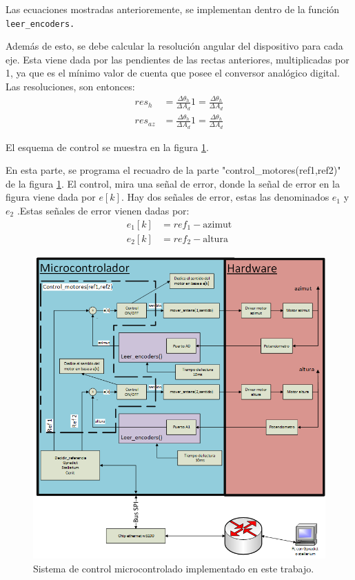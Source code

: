 Las ecuaciones mostradas anterioremente, se implementan dentro de la función \texttt{leer_encoders.} 

Además de esto, se debe calcular la resolución angular del dispositivo para cada eje. Esta viene dada por las pendientes de las rectas anteriores, multiplicadas por 1, ya que es el mínimo valor de cuenta que posee el conversor analógico digital. Las resoluciones, son entonces: 
\begin{equation}
	\begin{split}
		res_h &= \frac{ \Delta\theta_h}{\Delta A_d}  1 = \frac{ \Delta\theta_h}{\Delta A_d} \\  
		res_{az} &= \frac{ \Delta\theta_h}{\Delta A_d}  1 = \frac{ \Delta\theta_h}{\Delta A_d}   	
	\end{split}
\end{equation}


El esquema de control se muestra en la figura  \ref{fig:sist_control_real}. 

En esta parte, se programa el recuadro de la parte "control\_motores(ref1,ref2)" de la figura \ref{fig:sist_control_real}. El control, mira una señal de error, donde la señal de error en la figura viene dada por $e[k]$. Hay dos señales de error, estas las denominados $e_1 $ y $e_2$ .Estas señales de error vienen dadas por: 
\begin{equation}
	\begin{split}
		e_1[k]&=ref_1 - \text{azimut}  \\
	    e_2[k]&=ref_2 - \text{altura}  
	\end{split}
\end{equation}

\begin{figure}[pt]
	\hspace{-30mm}
	\includegraphics{control_realimentado}
	\caption{Sistema de control microcontrolado implementado en este trabajo.}
	\label{fig:sist_control_real}
\end{figure}

